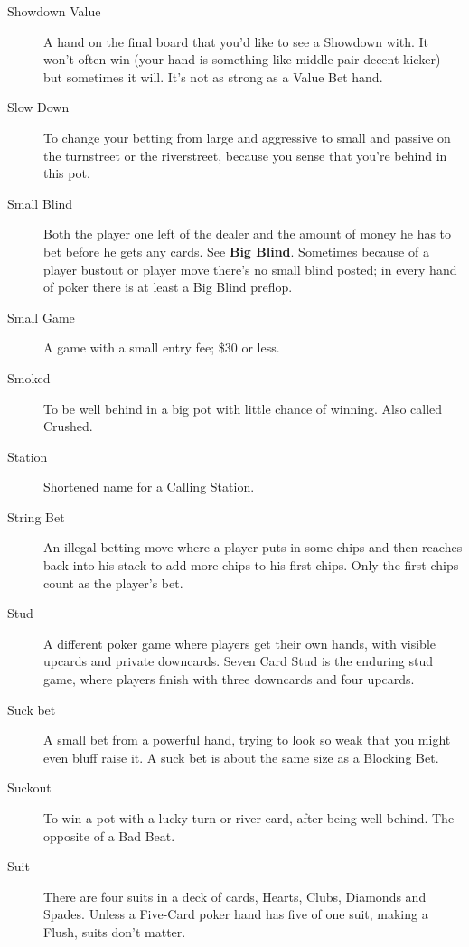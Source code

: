 \begin{description}
\item[Showdown Value] A hand on the final board that you'd like to see
a Showdown with. It won't often win (your hand is something like
middle pair decent kicker) but sometimes it will. It's not as strong
as a Value Bet hand.

\item[Slow Down] To change your betting from large and aggressive
to small and passive on the turnstreet or the riverstreet, because
you sense that you're behind in this pot.

\item[Small Blind] Both the player one left of the dealer and the
amount of money he has to bet before he gets any cards. See
\textbf{Big Blind}. Sometimes because of a player bustout or player
move there's no small blind posted; in every hand of poker there is at
least a Big Blind preflop.

\item[Small Game] A game with a small entry fee; \$30 or less.

\item[Smoked] To be well behind in a big pot with little chance of
winning. Also called Crushed.

\item[Station] Shortened name for a Calling Station.

\item[String Bet] An illegal betting move where a player puts in some
chips and then reaches back into his stack to add more chips to his
first chips. Only the first chips count as the player's bet.

\item[Stud] A different poker game where players get their own hands,
with visible upcards and private downcards. Seven Card Stud is the
enduring stud game, where players finish with three downcards and four
upcards.

\item[Suck bet] A small bet from a powerful hand, trying to look so
weak that you might even bluff raise it. A suck bet is about the same
size as a Blocking Bet.

\item[Suckout] To win a pot with a lucky turn or river card, after
being well behind. The opposite of a Bad Beat.

\item[Suit] There are four suits in a deck of cards, Hearts, Clubs,
Diamonds and Spades. Unless a Five-Card poker hand has five of one
suit, making a Flush, suits don't matter.


\end{description}
